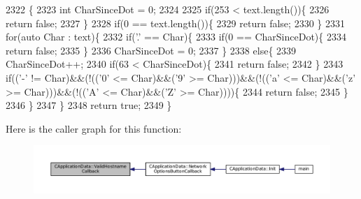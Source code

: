 \begin{DoxyCode}
2322                                                                  \{
2323     \textcolor{keywordtype}{int} CharSinceDot = 0;
2324 
2325     \textcolor{keywordflow}{if}(253 < text.length())\{
2326         \textcolor{keywordflow}{return} \textcolor{keyword}{false};    
2327     \}
2328     \textcolor{keywordflow}{if}(0 == text.length())\{
2329         \textcolor{keywordflow}{return} \textcolor{keyword}{false};
2330     \}
2331     \textcolor{keywordflow}{for}(\textcolor{keyword}{auto} Char : text)\{
2332         \textcolor{keywordflow}{if}(\textcolor{charliteral}{'.'} == Char)\{
2333             \textcolor{keywordflow}{if}(0 == CharSinceDot)\{
2334                 \textcolor{keywordflow}{return} \textcolor{keyword}{false};
2335             \}
2336             CharSinceDot = 0;
2337         \}
2338         \textcolor{keywordflow}{else}\{
2339             CharSinceDot++;
2340             \textcolor{keywordflow}{if}(63 < CharSinceDot)\{
2341                 \textcolor{keywordflow}{return} \textcolor{keyword}{false};   
2342             \}
2343             \textcolor{keywordflow}{if}((\textcolor{charliteral}{'-'} != Char)&&(!((\textcolor{charliteral}{'0'} <= Char)&&(\textcolor{charliteral}{'9'} >= Char)))&&(!((\textcolor{charliteral}{'a'} <= Char)&&(\textcolor{charliteral}{'z'} >= Char)))&&(!((\textcolor{charliteral}{'A'}
       <= Char)&&(\textcolor{charliteral}{'Z'} >= Char))))\{
2344                 \textcolor{keywordflow}{return} \textcolor{keyword}{false};
2345             \}
2346         \}
2347     \}
2348     \textcolor{keywordflow}{return} \textcolor{keyword}{true};
2349 \}
\end{DoxyCode}
Here is the caller graph for this function\+:\nopagebreak
\begin{figure}[H]
\begin{center}
\leavevmode
\includegraphics[width=350pt]{classCApplicationData_aad04c7da1cc86bef623efda1019907fd_icgraph}
\end{center}
\end{figure}
\hypertarget{classCApplicationData_adc8125cc7c4ad01bdd43e6550c6ba133}{}\label{classCApplicationData_adc8125cc7c4ad01bdd43e6550c6ba133} 
